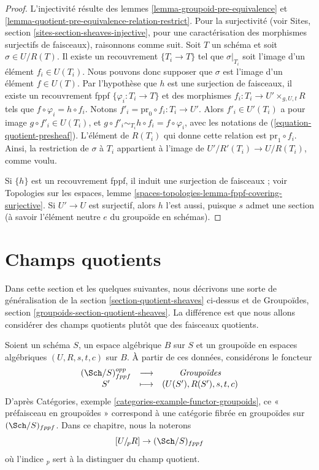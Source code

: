 \begin{proof}
L'injectivité résulte des lemmes \ref{lemma-groupoid-pre-equivalence} et \ref{lemma-quotient-pre-equivalence-relation-restrict}. Pour la surjectivité (voir Sites, section \ref{sites-section-sheaves-injective}, pour une caractérisation des morphismes surjectifs de faisceaux), raisonnons comme suit. Soit $T$ un schéma et soit $\sigma \in U/R(T)$. Il existe un recouvrement $\{T_i \to T\}$ tel que $\sigma|_{T_i}$ soit l'image d'un élément $f_i \in U(T_i)$. Nous pouvons donc supposer que $\sigma$ est l'image d'un élément $f \in U(T)$. Par l'hypothèse que $h$ est une surjection de faisceaux, il existe un recouvrement fppf $\{\varphi_i : T_i \to T\}$ et des morphismes $f_i : T_i \to U' \times_{g, U, t} R$ tels que $f \circ \varphi_i = h \circ f_i$. Notons $f'_i = \text{pr}_0 \circ f_i : T_i \to U'$. Alors $f'_i \in U'(T_i)$ a pour image $g \circ f'_i \in U(T_i)$, et $g \circ f'_i \sim_{T_i} h \circ f_i = f \circ \varphi_i$, avec les notations de (\ref{equation-quotient-presheaf}). L'élément de $R(T_i)$ qui donne cette relation est $\text{pr}_1 \circ f_i$. Ainsi, la restriction de $\sigma$ à $T_i$ appartient à l'image de $U'/R'(T_i) \to U/R(T_i)$, comme voulu.

\medskip\noindent
Si $\{h\}$ est un recouvrement fppf, il induit une surjection de faisceaux ; voir Topologies sur les espaces, lemme \ref{spaces-topologies-lemma-fppf-covering-surjective}. Si $U' \to U$ est surjectif, alors $h$ l'est aussi, puisque $s$ admet une section (à savoir l'élément neutre $e$ du groupoïde en schémas).
\end{proof}





\section{Champs quotients}
\label{section-stacks}

\noindent
Dans cette section et les quelques suivantes, nous décrivons une sorte de généralisation de la section \ref{section-quotient-sheaves} ci-dessus et de Groupoïdes, section \ref{groupoids-section-quotient-sheaves}. La différence est que nous allons considérer des champs quotients plutôt que des faisceaux quotients.

\medskip\noindent
Soient un schéma $S$, un espace algébrique $B$ sur $S$ et un groupoïde en espaces algébriques $(U, R, s, t, c)$ sur $B$. À partir de ces données, considérons le foncteur
\begin{equation}
\label{equation-quotient-stack}
\begin{matrix}
(\Sch/S)_{fppf}^{opp} &
\longrightarrow &
\textit{Groupoïdes} \\
S' &
\longmapsto &
(U(S'), R(S'), s, t, c)
\end{matrix}
\end{equation}
D'après Catégories, exemple \ref{categories-example-functor-groupoids}, ce « préfaisceau en groupoïdes » correspond à une catégorie fibrée en groupoïdes sur $(\Sch/S)_{fppf}$. Dans ce chapitre, nous la noterons
$$
[U/_{\!p}R] \to (\Sch/S)_{fppf}
$$
où l'indice ${}_p$ sert à la distinguer du champ quotient.

